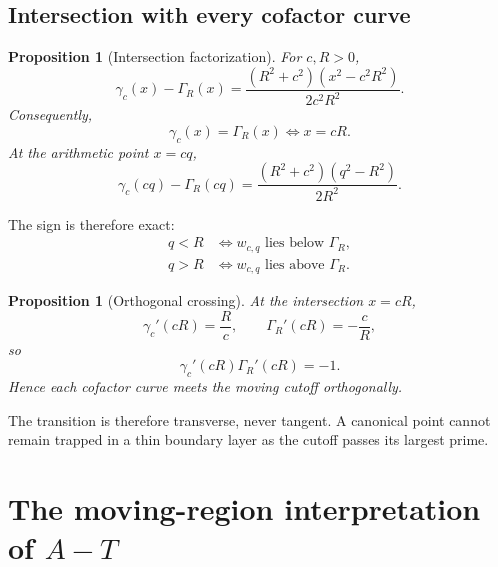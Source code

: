 \documentclass[11pt]{article}
\newtheorem{proposition}[theorem]{Proposition}
\theoremstyle{definition}
\theoremstyle{remark}
\newcommand{\1}{\mathbf{1}}
\begin{document}
\subsection{Intersection with every cofactor curve}

\begin{proposition}[Intersection factorization]
\label{prop:intersection-factorization}
For $c,R>0$,
\begin{equation}
 \gamma_c(x)-\Gamma_R(x)
 =
 \frac{(R^2+c^2)(x^2-c^2R^2)}{2c^2R^2}.
 \label{eq:curve-gap}
\end{equation}
Consequently,
\begin{equation}
 \gamma_c(x)=\Gamma_R(x)
 \iff x=cR.
 \label{eq:curve-intersection}
\end{equation}
At the arithmetic point $x=cq$,
\begin{equation}
 \gamma_c(cq)-\Gamma_R(cq)
 =
 \frac{(R^2+c^2)(q^2-R^2)}{2R^2}.
 \label{eq:point-gap}
\end{equation}
\end{proposition}

The sign is therefore exact:
\begin{align}
 q<R&\iff w_{c,q}\text{ lies below }\Gamma_R,
 \label{eq:below}\\
 q>R&\iff w_{c,q}\text{ lies above }\Gamma_R.
 \label{eq:above}
\end{align}

\begin{proposition}[Orthogonal crossing]
\label{prop:orthogonal-crossing}
At the intersection $x=cR$,
\begin{equation}
 \gamma_c'(cR)=\frac{R}{c},
 \qquad
 \Gamma_R'(cR)=-\frac{c}{R},
 \label{eq:orthogonal-slopes}
\end{equation}
so
\begin{equation}
 \gamma_c'(cR)\Gamma_R'(cR)=-1.
 \label{eq:orthogonal-product}
\end{equation}
Hence each cofactor curve meets the moving cutoff orthogonally.
\end{proposition}

The transition is therefore transverse, never tangent.  A canonical point cannot remain trapped in a thin boundary layer as the cutoff passes its largest prime.

\section{The moving-region interpretation of $A-T$}
\label{sec:moving-region-AT}
\end{document}
